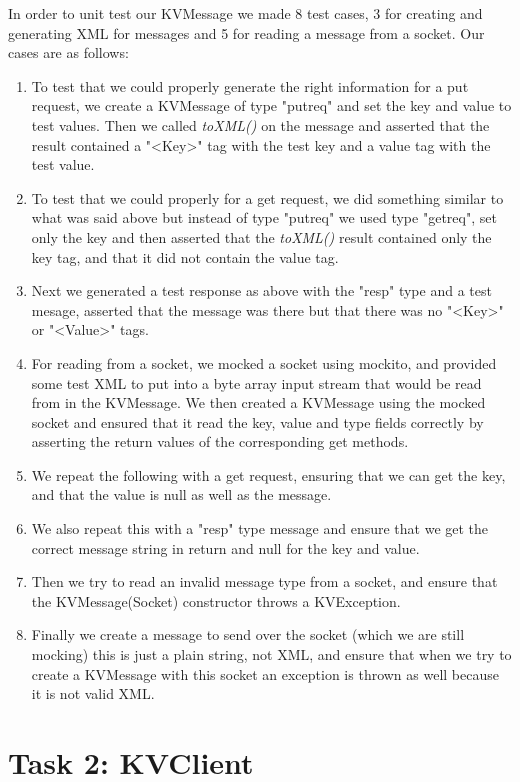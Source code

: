 \documentclass{article}
\begin{document}
In order to unit test our KVMessage we made 8 test cases, 3 for creating and generating XML for messages
and 5 for reading a message from a socket. Our cases are as follows:
\begin{enumerate}
\item To test that we could properly generate the right information for a put request, we create a KVMessage of type
"putreq" and set the key and value to test values. Then we called \textit{toXML()} on the message and asserted that the
result contained a "<Key>" tag with the test key and a value tag with the test value.
\item To test that we could properly for a get request, we did something similar to what was said above but instead of
type "putreq" we used type "getreq", set only the key and then asserted that the \textit{toXML()} result contained only
the key tag, and that it did not contain the value tag.
\item Next we generated a test response as above with the "resp" type and a test mesage, asserted that the message
was there but that there was no "<Key>" or "<Value>" tags.
\item For reading from a socket, we mocked a socket using mockito, and provided some test XML to put into a byte array
input stream that would be read from in the KVMessage. We then created a KVMessage using the mocked socket and ensured
that it read the key, value and type fields correctly by asserting the return values of the corresponding get methods.
\item We repeat the following with a get request, ensuring that we can get the key, and that the value is null as well
as the message.
\item We also repeat this with a "resp" type message and ensure that we get the correct message string in return and
null for the key and value.
\item Then we try to read an invalid message type from a socket, and ensure that the KVMessage(Socket) constructor
throws a KVException.
\item Finally we create a message to send over the socket (which we are still mocking) this is just a plain string, not
XML, and ensure that when we try to create a KVMessage with this socket an exception is thrown as well because it is not
valid XML.
\end{enumerate}

\section*{Task 2: KVClient}
\end{document}

